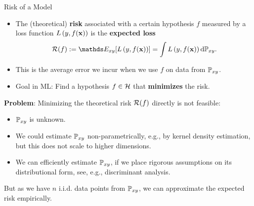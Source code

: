 \documentclass[11pt,compress,t,notes=noshow, xcolor=table]{beamer}
\begin{document}
\begin{vbframe}{Risk of a Model}

\begin{itemize}
  \item The (theoretical) \textbf{risk} associated with a certain hypothesis $f$ measured by a loss function $L\left(y, f(\mathbf{x})\right)$ is the \textbf{expected loss}
  $$ \riskf := \E_{xy} [\Lxy] = \int \Lxy \text{d}\Pxy. $$
  \item This is the average error we incur when we use $f$ on data from $\mathbb{P}_{xy}$.
  \item Goal in ML: Find a hypothesis $f \in \mathcal{H}$ that \textbf{minimizes} the risk.
\end{itemize}

\framebreak


\textbf{Problem}: Minimizing the theoretical risk $\mathcal{R}(f)$ directly is not feasible:

\begin{itemize}
\item $\mathbb{P}_{xy}$ is unknown. 
\item We could estimate $\mathbb{P}_{xy}$ non-parametrically, e.g., by kernel density estimation, but this does not scale to higher dimensions. 
\item We can efficiently estimate $\mathbb{P}_{xy}$, if we place rigorous assumptions on its distributional form, see, e.g., discriminant analysis. 
\end{itemize}

\lz

But as we have $n$ i.i.d. data points from $\mathbb{P}_{xy}$, we can
approximate the expected risk empirically. %

\end{vbframe}
\end{document}
